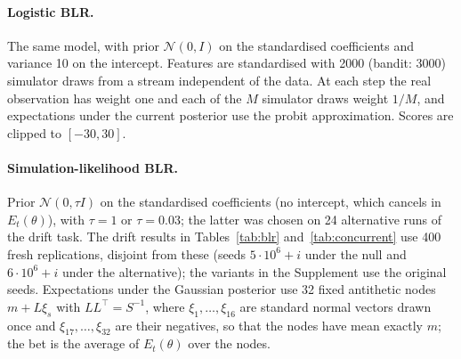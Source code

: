 \documentclass[11pt]{article}
\theoremstyle{remark}
\begin{document}
\paragraph{Logistic BLR.} The same model, with prior $\mathcal N(0, I)$ on the
standardised coefficients and variance 10 on the intercept. Features are
standardised with 2000 (bandit: 3000) simulator draws from a stream
independent of the data. At each step the real observation has weight one and
each of the $M$ simulator draws weight $1/M$, and expectations under the
current posterior use the probit approximation. Scores are clipped to
$[-30, 30]$.

\paragraph{Simulation-likelihood BLR.} Prior $\mathcal N(0, \tau I)$ on the
standardised coefficients (no intercept, which cancels in $E_t(\theta)$), with
$\tau = 1$ or $\tau = 0.03$; the latter was chosen on 24 alternative runs of the
drift task. The drift results in Tables~\ref{tab:blr} and~\ref{tab:concurrent}
use 400 fresh replications, disjoint from these (seeds $5\cdot10^6+i$ under the
null and $6\cdot10^6+i$ under the alternative); the variants in the Supplement
use the original seeds. Expectations under the Gaussian
posterior use 32 fixed antithetic nodes $m + L\xi_s$ with $LL^\top = S^{-1}$,
where $\xi_1, \ldots, \xi_{16}$ are standard normal vectors drawn once and
$\xi_{17}, \ldots, \xi_{32}$ are their negatives, so that the nodes have mean
exactly $m$; the bet is the average of $E_t(\theta)$ over the nodes.
\end{document}
